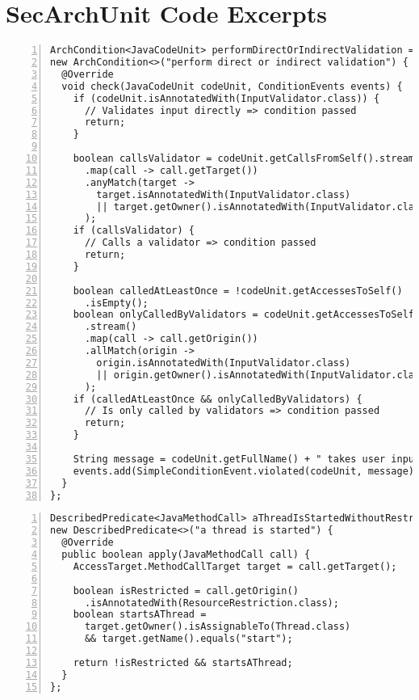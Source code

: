 \chapter{SecArchUnit Code Excerpts}
\begin{lstlisting}[caption=Constraint 4: performDirectOrIndirectValidation custom condition., captionpos=b, label=lst:constraint_4_condition, numbers=left, showstringspaces=false]
ArchCondition<JavaCodeUnit> performDirectOrIndirectValidation =
new ArchCondition<>("perform direct or indirect validation") {
  @Override
  void check(JavaCodeUnit codeUnit, ConditionEvents events) {
    if (codeUnit.isAnnotatedWith(InputValidator.class)) {
      // Validates input directly => condition passed
      return;
    }

    boolean callsValidator = codeUnit.getCallsFromSelf().stream()
      .map(call -> call.getTarget())
      .anyMatch(target -> 
        target.isAnnotatedWith(InputValidator.class)
        || target.getOwner().isAnnotatedWith(InputValidator.class)
      );
    if (callsValidator) {
      // Calls a validator => condition passed
      return;
    }

    boolean calledAtLeastOnce = !codeUnit.getAccessesToSelf()
      .isEmpty();
    boolean onlyCalledByValidators = codeUnit.getAccessesToSelf()
      .stream()
      .map(call -> call.getOrigin())
      .allMatch(origin -> 
        origin.isAnnotatedWith(InputValidator.class)
        || origin.getOwner().isAnnotatedWith(InputValidator.class)
      );
    if (calledAtLeastOnce && onlyCalledByValidators) {
      // Is only called by validators => condition passed
      return;
    }

    String message = codeUnit.getFullName() + " takes user input that is never validated";
    events.add(SimpleConditionEvent.violated(codeUnit, message));
  }
};
\end{lstlisting}

\begin{lstlisting}[caption={Constraint 5: aThreadIsStartedWithoutRestriction custom predicate.}, captionpos=b, label=lst:constraint_5_predicate_1, numbers=left, showstringspaces=false]
DescribedPredicate<JavaMethodCall> aThreadIsStartedWithoutRestriction =
new DescribedPredicate<>("a thread is started") {
  @Override
  public boolean apply(JavaMethodCall call) {
    AccessTarget.MethodCallTarget target = call.getTarget();

    boolean isRestricted = call.getOrigin()
      .isAnnotatedWith(ResourceRestriction.class);
    boolean startsAThread = 
      target.getOwner().isAssignableTo(Thread.class)
      && target.getName().equals("start");

    return !isRestricted && startsAThread;
  }
};
\end{lstlisting}

